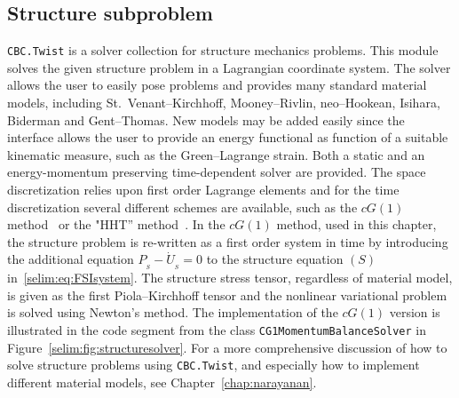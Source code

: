 
\subsection{Structure subproblem}

\texttt{CBC.Twist} is a solver collection for structure mechanics
problems. This module solves the given structure problem in a
Lagrangian coordinate system.  The solver allows the user to easily
pose problems and provides many standard material models, including
St.~Venant--Kirchhoff, Mooney--Rivlin, neo--Hookean, Isihara, Biderman
and Gent--Thomas. New models may be added easily since the interface
allows the user to provide an energy functional as function of a
suitable kinematic measure, such as the Green--Lagrange strain. Both a
static and an energy-momentum preserving time-dependent solver are
provided. The space discretization relies upon first order Lagrange
elements and for the time discretization several different schemes are
available, such as the $cG(1)$
method~\cite{ErikssonEstepHansboEtAl1996, ErikssonEstepJohnson2003} or
the "HHT'' method~\cite{HilberHughesTaylor1977}.  In the $cG(1)$
method, used in this chapter, the structure problem is re-written as a
first order system in time by introducing the additional equation
$P_{_{S}} - \dot{U}_{_{S}} = 0$ to the structure equation $(S)$
in~\eqref{selim:eq:FSIsystem}. The structure stress tensor, regardless
of material model, is given as the first Piola--Kirchhoff tensor and
the nonlinear variational problem is solved using Newton's method.
The implementation of the $cG(1)$ version is illustrated in the code
segment from the class \texttt{CG1MomentumBalanceSolver} in
Figure~\ref{selim:fig:structuresolver}. For a more comprehensive
discussion of how to solve structure problems using
\texttt{CBC.Twist}, and especially how to implement different material
models, see Chapter~\ref{chap:narayanan}.

